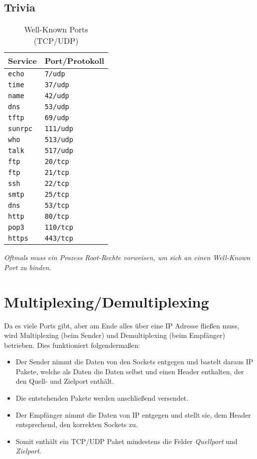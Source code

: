 		\subsection{Trivia}
			\begin{table}[H]
				\centering
				\begin{tabular}{l | l}
					Service         & Port/Protokoll   \\ \hline
					\texttt{echo}   & \texttt{7/udp}   \\
					\texttt{time}   & \texttt{37/udp}  \\
					\texttt{name}   & \texttt{42/udp}  \\
					\texttt{dns}    & \texttt{53/udp}  \\
					\texttt{tftp}   & \texttt{69/udp}  \\
					\texttt{sunrpc} & \texttt{111/udp} \\
					\texttt{who}    & \texttt{513/udp} \\
					\texttt{talk}   & \texttt{517/udp} \\ \hline
					\texttt{ftp}    & \texttt{20/tcp}  \\
					\texttt{ftp}    & \texttt{21/tcp}  \\
					\texttt{ssh}    & \texttt{22/tcp}  \\
					\texttt{smtp}   & \texttt{25/tcp}  \\
					\texttt{dns}    & \texttt{53/tcp}  \\
					\texttt{http}   & \texttt{80/tcp}  \\
					\texttt{pop3}   & \texttt{110/tcp} \\
					\texttt{https}  & \texttt{443/tcp}
				\end{tabular}
				\caption{Well-Known Ports (TCP/UDP)}
			\end{table}

			\textit{Oftmals muss ein Prozess Root-Rechte vorweisen, um sich an einen Well-Known Port zu binden.}

	\section{Multiplexing/Demultiplexing}
		\label{sec:demultiplexing}

		Da es viele Ports gibt, aber am Ende alles über eine IP Adresse fließen muss, wird Multiplexing (beim Sender) und Demultiplexing (beim Empfänger) betrieben. Dies funktioniert folgendermaßen:
		\begin{itemize}
			\item Der Sender nimmt die Daten von den Sockets entgegen und bastelt daraus IP Pakete, welche als Daten die Daten selbst und einen Header enthalten, der den Quell- und Zielport enthält.
			\item Die entstehenden Pakete werden anschließend versendet.
			\item Der Empfänger nimmt die Daten von IP entgegen und stellt sie, dem Header entsprechend, den korrekten Sockets zu.
			\item Somit enthält ein TCP/UDP Paket mindestens die Felder \textit{Quellport} und \textit{Zielport}.
		\end{itemize}

